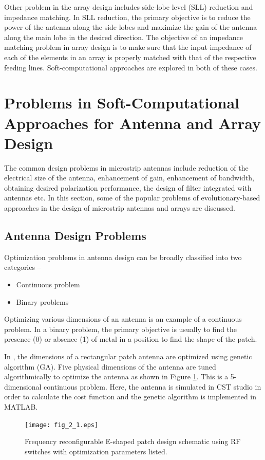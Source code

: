 Other problem in the array design includes side-lobe level (SLL) reduction and impedance matching. In SLL reduction, the primary objective is to reduce the power of the antenna along the side lobes and maximize the gain of the antenna along the main lobe in the desired direction. The objective of an impedance matching problem in array design is to make sure that the input impedance of each of the elements in an array is properly matched with that of the respective feeding lines. Soft-computational approaches are explored in both of these cases.

\section{Problems in Soft-Computational Approaches for Antenna and Array Design} \label{c2sec_problems}
The common design problems in microstrip antennas include reduction of the electrical size of the antenna, enhancement of gain, enhancement of bandwidth, obtaining desired polarization performance, the design of filter integrated with antennas etc. In this section, some of the popular problems of evolutionary-based approaches in the design of microstrip antennas and arrays are discussed.
\subsection{Antenna Design Problems}
Optimization problems in antenna design can be broadly classified into two categories --
\begin{itemize}
\item Continuous problem
\item Binary problems
\end{itemize}

Optimizing various dimensions of an antenna is an example of a continuous problem. In a binary problem, the primary objective is usually to find the presence (0) or absence (1) of metal in a position to find the shape of the patch.

In \cite{patch_miniaturize_ga}, the dimensions of a rectangular patch antenna are optimized using genetic algorithm (GA). Five physical dimensions of the antenna are tuned algorithmically to optimize the antenna as shown in Figure \ref{fig_2_1}. This is a 5-dimensional continuous problem. Here, the antenna is simulated in CST studio in order to calculate the cost function and the genetic algorithm is implemented in MATLAB.

\begin{figure}
  \centering
  \texttt{[image: fig\_2\_1.eps]}\\
  \caption[Frequency reconfigurable E-shaped patch design schematic using RF switches with optimization parameters listed.] {Frequency reconfigurable E-shaped patch design schematic using RF switches with optimization parameters listed. \cite{patch_miniaturize_ga}} \label{fig_2_1}
\end{figure}

